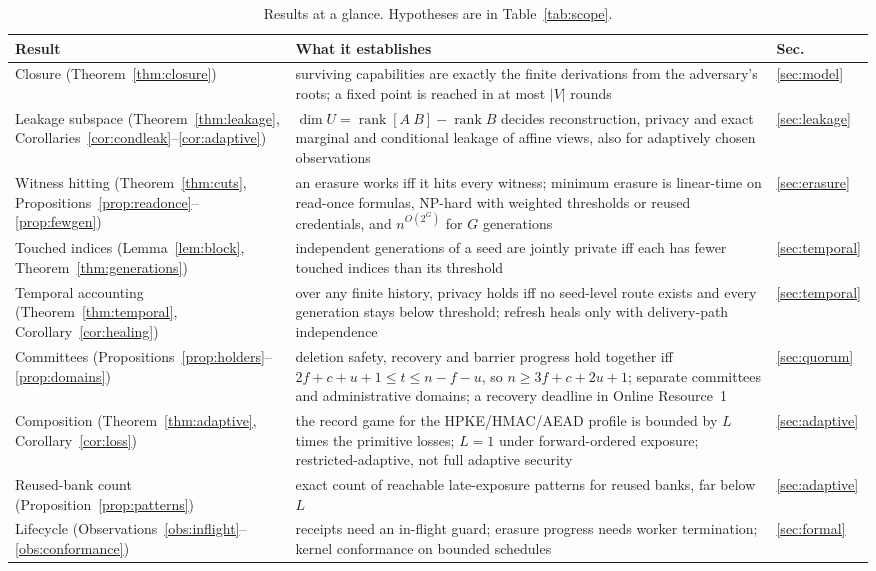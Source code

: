 \documentclass[pdflatex,sn-mathphys-num]{sn-jnl}%
\theoremstyle{plain}
\theoremstyle{definition}
\newcommand{\rk}{\operatorname{rank}}
\begin{document}
\begin{table}[htbp]
\caption{Results at a glance. Hypotheses are in Table~\ref{tab:scope}.}\label{tab:glance}
\centering\footnotesize
\begin{tabularx}{\linewidth}{@{}>{\raggedright\arraybackslash}p{.25\linewidth}Y>{\raggedright\arraybackslash}p{.07\linewidth}@{}}\toprule
Result & What it establishes & Sec.\\\midrule
Closure (Theorem~\ref{thm:closure}) & surviving capabilities are exactly the finite derivations from the adversary's roots; a fixed point is reached in at most $|V|$ rounds & \ref{sec:model}\\
Leakage subspace (Theorem~\ref{thm:leakage}, Corollaries~\ref{cor:condleak}--\ref{cor:adaptive}) & $\dim U=\rk[A\ B]-\rk B$ decides reconstruction, privacy and exact marginal and conditional leakage of affine views, also for adaptively chosen observations & \ref{sec:leakage}\\
Witness hitting (Theorem~\ref{thm:cuts}, Propositions~\ref{prop:readonce}--\ref{prop:fewgen}) & an erasure works iff it hits every witness; minimum erasure is linear-time on read-once formulas, NP-hard with weighted thresholds or reused credentials, and $n^{O(2^G)}$ for $G$ generations & \ref{sec:erasure}\\
Touched indices (Lemma~\ref{lem:block}, Theorem~\ref{thm:generations}) & independent generations of a seed are jointly private iff each has fewer touched indices than its threshold & \ref{sec:temporal}\\
Temporal accounting (Theorem~\ref{thm:temporal}, Corollary~\ref{cor:healing}) & over any finite history, privacy holds iff no seed-level route exists and every generation stays below threshold; refresh heals only with delivery-path independence & \ref{sec:temporal}\\
Committees (Propositions~\ref{prop:holders}--\ref{prop:domains}) & deletion safety, recovery and barrier progress hold together iff $2f+c+u+1\le t\le n-f-u$, so $n\ge3f+c+2u+1$; separate committees and administrative domains; a recovery deadline in Online Resource~1 & \ref{sec:quorum}\\
Composition (Theorem~\ref{thm:adaptive}, Corollary~\ref{cor:loss}) & the record game for the HPKE/HMAC/AEAD profile is bounded by $L$ times the primitive losses; $L=1$ under forward-ordered exposure; restricted-adaptive, not full adaptive security & \ref{sec:adaptive}\\
Reused-bank count (Proposition~\ref{prop:patterns}) & exact count of reachable late-exposure patterns for reused banks, far below $L$ & \ref{sec:adaptive}\\
Lifecycle (Observations~\ref{obs:inflight}--\ref{obs:conformance}) & receipts need an in-flight guard; erasure progress needs worker termination; kernel conformance on bounded schedules & \ref{sec:formal}\\\bottomrule
\end{tabularx}
\end{table}
\end{document}
